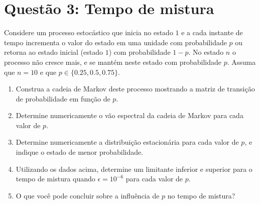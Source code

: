 \section*{Questão 3: Tempo de mistura}
Considere um processo estocástico que inicia no estado $1$ e a cada instante de tempo incrementa o valor do estado em uma unidade com probabilidade $p$ ou retorna ao estado inicial (estado $1$) com probabilidade $1-p$. No estado $n$ o processo não cresce mais, e se mantém neste estado com probabilidade $p$. Assuma que $n = 10$ e que $p \in \{0.25, 0.5, 0.75\}$.

\begin{enumerate}
    \item Construa a cadeia de Markov deste processo mostrando a matriz de transição de probabilidade em função de $p$.
    \item Determine numericamente o vão espectral da cadeia de Markov para cada valor de $p$.
    \item Determine numericamente a distribuição estacionária para cada valor de $p$, e indique o estado de menor probabilidade.
    \item Utilizando os dados acima, determine um limitante inferior e superior para o tempo de mistura quando $\epsilon = 10^{-6}$ para cada valor de $p$.
    \item O que você pode concluir sobre a influência de $p$ no tempo de mistura?
\end{enumerate}

